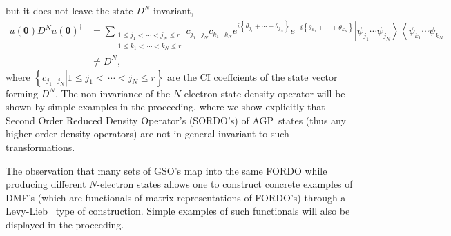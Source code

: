 \documentclass[aps,preprint]{revtex4}%
\begin{document}
but it does not leave the state $D^{N}$ invariant,
\begin{align}
u\left(  \boldsymbol{\theta}\right)  D^{N}u\left(  \boldsymbol{\theta}\right)
^{\dagger}  & =\sum_{\substack{1\leq j_{1}<\,\cdots<j_{N}\leq r\\1\leq
k_{1}<\,\cdots<k_{N}\leq r}}\bar{c}_{j_{1}\cdots j_{N}}c_{k_{1}\cdots k_{N}%
}e^{i\left\{  \theta_{j_{1}}+\cdots+\theta_{j_{N}}\right\}  }e^{-i\left\{
\theta_{k_{1}}+\cdots+\theta_{k_{N}}\right\}  }\left\vert \psi_{j_{1}}%
\cdots\psi_{j_{N}}\right\rangle \left\langle \psi_{k_{1}}\cdots\psi_{k_{N}%
}\right\vert \nonumber\\
& \neq D^{N},
\end{align}
where $\left\{  \left.  c_{j_{1}\cdots j_{N}}\right\vert 1\leq j_{1}%
<\,\cdots<j_{N}\leq r\right\}  $ are the CI coeffcients of the state vector
forming $D^{N}.$ The non invariance of the $N$-electron state density operator
will be shown by simple examples in the proceeding, where we show explicitly
that Second Order Reduced Density Operator's (SORDO's) of AGP\ states (thus
any higher order density operators) are not in general invariant to such transformations.

The observation that many sets of GSO's map into the same FORDO while
producing different $N$-electron states allows one to construct concrete
examples of DMF's (which are functionals of matrix representations of FORDO's)
through a Levy-Lieb \cite{Levy1979, Lieb1983}\ type of construction. Simple
examples of such functionals will also be displayed in the proceeding.
\end{document}

